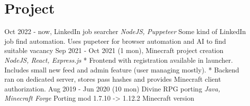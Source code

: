 \documentclass[a4paper]{moderncv}        %
\begin{document}
\section{Project}
\cventry
{}
{Oct 2022 - now, LinkedIn job searcher}
{}
{\textit{NodeJS, Puppeteer}}
{}
{Some kind of LinkedIn job find automation. Uses pupeteer for
browser automation and AI to find suitable vacancy
\newline
{}}
\vspace{1mm}
\cventry
{}
{Sep 2021 - Oct 2021 (1 mon), Minecraft project creation}
{}
{\textit{NodeJS, React, Express.js}}
{}
{
	* Frontend with registration available in launcher. Includes
	small new feed and admin feature (user managing mostly).
	\newline
	* Backend ran on dedicated server, stores pass hashes
	and provides Minecraft client authorization.
}
\vspace{1mm}
\cventry
{}
{Aug 2019 - Jun 2020 (10 mon) Divine RPG porting}
{}
{\textit{Java, Minecraft Forge}}
{}
{Porting mod 1.7.10 -\textgreater{} 1.12.2 Minecraft version
\newline
{}}


\ 
\end{document}
